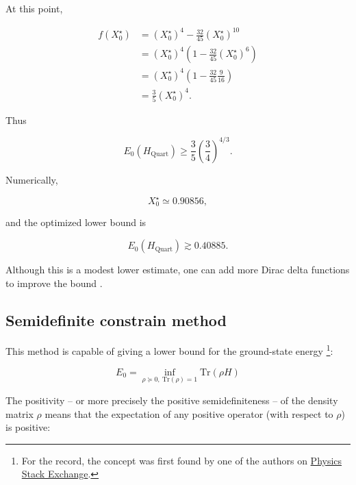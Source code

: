 \documentclass{article}
\theoremstyle{definition}
\begin{document}
At this point,

\begin{align}
    f(X_0^\star)
    &=
    (X_0^\star)^4
    -
    \frac{32}{45}(X_0^\star)^{10}
    \\
    &=
    (X_0^\star)^4
    \left(
        1-\frac{32}{45}(X_0^\star)^6
    \right)
    \\
    &=
    (X_0^\star)^4
    \left(
        1-\frac{32}{45}\frac{9}{16}
    \right)
    \\
    &=
    \frac{3}{5}(X_0^\star)^4.
\end{align}

Thus

\begin{equation}
    \boxed{
        E_0(H_{\mathrm{Quart}})
        \geq
        \frac{3}{5}
        \left(\frac{3}{4}\right)^{4/3}
    }.
\end{equation}

Numerically,

\begin{equation}
    X_0^\star
    \simeq
    0.90856,
\end{equation}

and the optimized lower bound is

\begin{equation}
    \boxed{
        E_0(H_{\mathrm{Quart}})
        \gtrsim
        0.40885
    }.
\end{equation}

Although this is a modest lower estimate, one can add more Dirac delta functions to improve the bound \cite{book:Albeverio2005}.


\subsection{Semidefinite constrain method}

This method is capable of giving a lower bound for the ground-state energy \cite{paper:Kull2024, paper:BaumgratzPlenio2012}\footnote{For the record, the concept was first found by one of the authors on \href{https://physics.stackexchange.com/questions/818997/how-to-get-a-lower-bound-of-the-ground state-energy}{Physics Stack Exchange}.}:

\begin{equation}
    E_0 = \inf_{\rho \succcurlyeq 0, \  \mathrm{Tr} (\rho) = 1} \mathrm{Tr}(\rho H)
\end{equation}

The positivity -- or more precisely the positive semidefiniteness -- of the density matrix $\rho$ means that the expectation of any positive operator (with respect to $\rho$) is positive:
\end{document}

